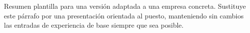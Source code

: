 
\begin{cvparagraph}

Resumen plantilla para una versi\'on adaptada a una empresa concreta. Sustituye este p\'arrafo por una presentaci\'on orientada al puesto, manteniendo sin cambios las entradas de experiencia de base siempre que sea posible.

\end{cvparagraph}
